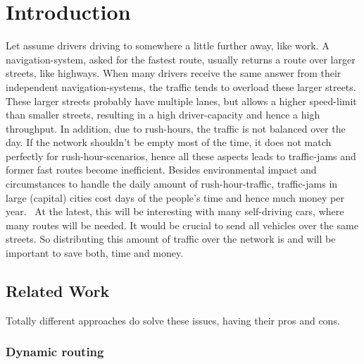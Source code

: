 \chapter{Introduction}
\label{chap:introduction}


Let assume drivers driving to somewhere a little further away, like work.
A navigation-system, asked for the fastest route, usually returns a route over larger streets, like highways.
When many drivers receive the same answer from their independent navigation-systems, the traffic tends to overload these larger streets.
These larger streets probably have multiple lanes, but allows a higher speed-limit than smaller streets, resulting in a high driver-capacity and hence a high throughput.
In addition, due to rush-hours, the traffic is not balanced over the day.
If the network shouldn't be empty most of the time, it does not match perfectly for rush-hour-scenarios, hence all these aspects leads to traffic-jams and former fast routes become inefficient.
Besides environmental impact and circumstances to handle the daily amount of rush-hour-traffic, traffic-jams in large (capital) cities cost days of the people's time and hence much money per year.~\cite{inrix:traffic-cost}
At the latest, this will be interesting with many self-driving cars, where many routes will be needed.
It would be crucial to send all vehicles over the same streets.
So distributing this amount of traffic over the network is and will be important to save both, time and money.

\section{Related Work}

    Totally different approaches do solve these issues, having their pros and cons.

    \subsection{Dynamic routing}

